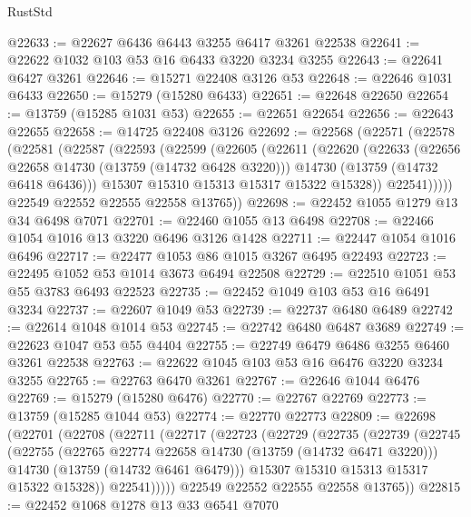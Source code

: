 \begin{lexlean}{RustStd}
\begin{coremodule}
@22633 := @22627 @6436 @6443 @3255 @6417 @3261 @22538
@22641 := @22622 @1032 @103 @53 @16 @6433 @3220 @3234 @3255
@22643 := @22641 @6427 @3261
@22646 := @15271 @22408 @3126 @53
@22648 := @22646 @1031 @6433
@22650 := @15279 (@15280 @6433)
@22651 := @22648 @22650
@22654 := @13759 (@15285 @1031 @53)
@22655 := @22651 @22654
@22656 := @22643 @22655
@22658 := @14725 @22408 @3126
@22692 := @22568
    (@22571
      (@22578
        (@22581
          (@22587
            (@22593
              (@22599
                (@22605
                  (@22611
                    (@22620
                      (@22633
                        (@22656 @22658 @14730 (@13759 (@14732 @6428 @3220)))
                        @14730
                        (@13759 (@14732 @6418 @6436)))
                      @15307
                      @15310
                      @15313
                      @15317
                      @15322
                      @15328))
                  @22541)))))
        @22549
        @22552
        @22555
        @22558
        @13765))
@22698 := @22452 @1055 @1279 @13 @34 @6498 @7071
@22701 := @22460 @1055 @13 @6498
@22708 := @22466 @1054 @1016 @13 @3220 @6496 @3126 @1428
@22711 := @22447 @1054 @1016 @6496
@22717 := @22477 @1053 @86 @1015 @3267 @6495 @22493
@22723 := @22495 @1052 @53 @1014 @3673 @6494 @22508
@22729 := @22510 @1051 @53 @55 @3783 @6493 @22523
@22735 := @22452 @1049 @103 @53 @16 @6491 @3234
@22737 := @22607 @1049 @53
@22739 := @22737 @6480 @6489
@22742 := @22614 @1048 @1014 @53
@22745 := @22742 @6480 @6487 @3689
@22749 := @22623 @1047 @53 @55 @4404
@22755 := @22749 @6479 @6486 @3255 @6460 @3261 @22538
@22763 := @22622 @1045 @103 @53 @16 @6476 @3220 @3234 @3255
@22765 := @22763 @6470 @3261
@22767 := @22646 @1044 @6476
@22769 := @15279 (@15280 @6476)
@22770 := @22767 @22769
@22773 := @13759 (@15285 @1044 @53)
@22774 := @22770 @22773
@22809 := @22698
    (@22701
      (@22708
        (@22711
          (@22717
            (@22723
              (@22729
                (@22735
                  (@22739
                    (@22745
                      (@22755
                        (@22765 @22774 @22658 @14730 (@13759 (@14732 @6471 @3220)))
                        @14730
                        (@13759 (@14732 @6461 @6479)))
                      @15307
                      @15310
                      @15313
                      @15317
                      @15322
                      @15328))
                  @22541)))))
        @22549
        @22552
        @22555
        @22558
        @13765))
@22815 := @22452 @1068 @1278 @13 @33 @6541 @7070

\end{coremodule}
\end{lexlean}

